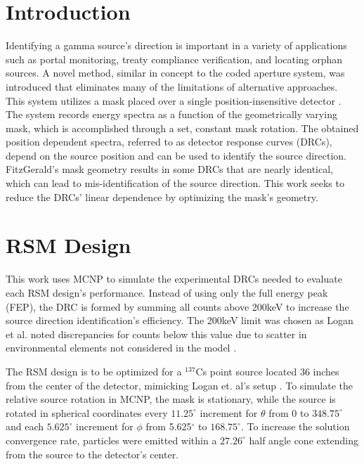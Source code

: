 \documentclass[twocolumn,10pt,final]{asme2ej}
\begin{document}
\section{Introduction}
\label{intro}
Identifying a gamma source's direction is important in a variety of applications such as portal monitoring, treaty compliance verification, and locating orphan sources.  
A novel method, similar in concept to the coded aperture system, was introduced that eliminates many of the limitations of alternative approaches.
This system utilizes a mask placed over a single position-insensitive detector \cite{FitzGerald2015}.  
The system records energy spectra as a function of the geometrically varying mask, which is accomplished through a set, constant mask rotation. 
The obtained position dependent spectra, referred to as detector response curves (DRCs), depend on the source position and can be used to identify the source direction.  FitzGerald's mask geometry results in some DRCs that are nearly identical, which can lead to mis-identification of the source direction.  
This work seeks to reduce the DRCs' linear dependence by optimizing the mask's geometry.

\vspace{-0.3 cm}
\section{RSM Design} \label{sec:rsm-design}
This work uses MCNP to simulate the experimental DRCs needed to evaluate each RSM design's performance.  
Instead of using only the full energy peak (FEP), the DRC is formed by summing all counts above 200keV to increase the source direction identification's efficiency.  
The 200keV limit was chosen as Logan et al. noted discrepancies for counts below this value due to scatter in environmental elements not considered in the model \cite{Logan2017}.

The RSM design is to be optimized for a $^{137}$Cs point source located 36 inches from the center of the detector, mimicking Logan et. al's setup \cite{Logan2017}.  
To simulate the relative source rotation in MCNP, the mask is stationary, while the source is rotated in spherical coordinates every $11.25^\circ$ increment for $\theta$ from 0 to $348.75^\circ$ and each $5.625^\circ$ increment for $\phi$ from 5.625$^\circ$ to $168.75^\circ$.  
To increase the solution convergence rate, particles were emitted within a $27.26^\circ$ half angle cone extending from the source to the detector's center.  
\end{document}
